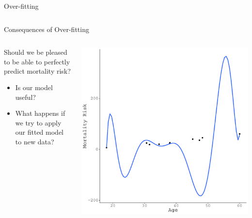 \documentclass{beamer}\usepackage[]{graphicx}\usepackage[]{color}
\makeatletter
\def\maxwidth{ %
  \ifdim\Gin@nat@width>\linewidth
    \linewidth
  \else
    \Gin@nat@width
  \fi
}
\newenvironment{knitrout}{}{} %
\makeatother
\begin{document}
\begin{frame}{Over-fitting}
\begin{columns}
\begin{column}{0.5\textwidth}
\begin{knitrout}
{}



\end{knitrout}

\end{column}
\end{columns}

\end{frame}


\begin{frame}{Consequences of Over-fitting}
  
  \begin{columns}
    \begin{column}{0.5\textwidth}
      
      Should we be pleased to be able to perfectly predict mortality risk? 
      \vb
      \begin{itemize}
      \item Is our model useful?
        \vc
      \item What happens if we try to apply our fitted model to new data?
      \end{itemize}
      
    \end{column}
    
    \pause
    
    \begin{column}{0.5\textwidth}
      
\begin{knitrout}\footnotesize
{}\color{fgcolor}

{\centering \includegraphics[width=\maxwidth]{figure/unnamed-chunk-15-1} 

}
\end{knitrout}
\end{column}
\end{columns}
\end{frame}
\end{document}
